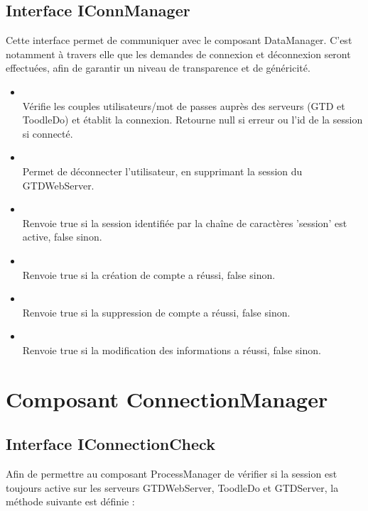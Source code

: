 	
	\subsection{Interface IConnManager}
	Cette interface permet de communiquer avec le composant DataManager. C'est notamment à travers elle que les demandes de connexion et déconnexion seront effectuées, afin de garantir un niveau de transparence et de généricité.
	
	
	\begin{itemize}
		\item {} \\
		Vérifie les couples utilisateurs/mot de passes auprès des serveurs (GTD et ToodleDo) et établit la connexion.
		Retourne null si erreur ou l'id de la session si connecté.
		\item {} \\
		Permet de déconnecter l'utilisateur, en supprimant la session du GTDWebServer.
		\item {} \\
		Renvoie true si la session identifiée par la chaîne de caractères 'session' est active, false sinon.
		\item {} \\
		Renvoie true si la création de compte a réussi, false sinon.
		\item {} \\
		Renvoie true si la suppression de compte a réussi, false sinon.
		\item {} \\
		Renvoie true si la modification des informations a réussi, false sinon.
	\end{itemize}	


\section{Composant ConnectionManager}

	\subsection{Interface IConnectionCheck}
	Afin de permettre au composant ProcessManager de vérifier si la session est
	toujours active sur les serveurs GTDWebServer, ToodleDo et GTDServer, la
	méthode suivante est définie :
	
